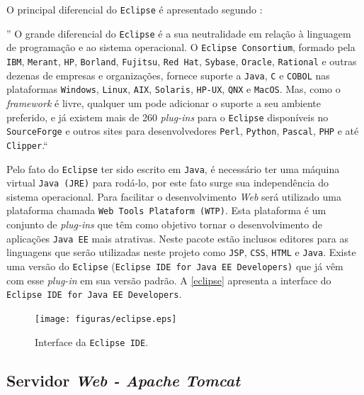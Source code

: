 O principal diferencial do \texttt{Eclipse} é apresentado segundo \cite{augustoeclipse}:

\begin{citacao}

 '' O grande diferencial do \texttt{Eclipse} é a sua neutralidade em relação à linguagem de programação e ao sistema operacional. 
 O \texttt{Eclipse Consortium}, formado pela \texttt{IBM}, \texttt{Merant}, \texttt{HP}, \texttt{Borland}, \texttt{Fujitsu}, \texttt{Red Hat}, \texttt{Sybase}, \texttt{Oracle}, \texttt{Rational} e outras dezenas 
 de empresas e organizações, fornece suporte a \texttt{Java}, \texttt{C} e \texttt{COBOL} nas plataformas \texttt{Windows}, \texttt{Linux}, \texttt{AIX}, \texttt{Solaris}, \texttt{HP-UX}, \texttt{QNX} e
 \texttt{MacOS}. Mas, como o \textit{framework} é livre, qualquer um pode adicionar o suporte a seu ambiente preferido, e já existem mais de 
 260 \textit{plug-ins} para o \texttt{Eclipse} disponíveis no \texttt{SourceForge} e outros sites para desenvolvedores \texttt{Perl}, \texttt{Python}, \texttt{Pascal}, \texttt{PHP} e até \texttt{Clipper}.``
 
\end{citacao}

Pelo fato do \texttt{Eclipse} ter sido escrito em \texttt{Java}, é necessário ter uma máquina virtual \texttt{Java (JRE)} para rodá-lo, por este fato surge 
sua independência do sistema operacional.
Para facilitar o desenvolvimento \textit{Web} será utilizado uma plataforma chamada \texttt{Web Tools Plataform (WTP)}. Esta plataforma é um 
conjunto de \textit{plug-ins} que têm como objetivo tornar o desenvolvimento de aplicações \texttt{Java EE} mais atrativas. Neste pacote estão 
inclusos editores para as linguagens que serão utilizadas neste projeto como \texttt{JSP}, \texttt{CSS}, \texttt{HTML} e \texttt{Java}. Existe uma versão do \texttt{Eclipse} 
(\texttt{Eclipse IDE for Java EE Developers)} que já vêm com esse \textit{plug-in} em sua versão padrão. A \autoref{eclipse} apresenta a interface do \texttt{Eclipse IDE
for Java EE Developers}.

 \begin{figure}[h]
	\centering
	\caption{\label{eclipse}Interface da \texttt{Eclipse IDE}.}
		\texttt{[image: figuras/eclipse.eps]}
\end{figure}

\subsection{Servidor \textit{Web - Apache Tomcat}}

